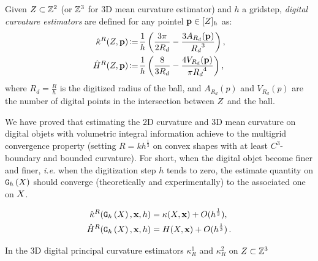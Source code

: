 \documentclass{llncs}
\newcommand{\ie}{\emph{i.e.} }
\begin{document}
\begin{Definition}
  Given $Z \subset {\mathbb{Z}}^2$ (or ${\mathbb{Z}}^3$ for 3D mean curvature estimator) and
  $h$ a gridstep, {\em digital curvature estimators} are defined for any pointel
  $\mathbf{p} \in \lbrack Z \rbrack_{h}$ as:
  \begin{align}
   \hat{\kappa}^{R}(Z,\mathbf{p}) &\!\mathrel{\mathop:}=\! \frac{1}{h} \left( \frac{3 \pi}{2 R_d} - \frac{3 A_{R_d}(\mathbf{p})}{{R_d}^3} \right),\label{eq:dig-curvature-estimator-k}\\
   \hat{H}^{R}(Z,\mathbf{p}) &\!\mathrel{\mathop:}=\! \frac{1}{h} \left( \frac{8}{3 R_d} - \frac{4V_{R_d}(\mathbf{p})}{{\pi R_d}^4} \right),\label{eq:dig-curvature-estimator-H}
  \end{align}
  where $R_d = \frac{R}{h}$ is the digitized radius of the ball, and
  $A_{R_d}(p)$ and $V_{R_d}(p)$ are the number of digital points in the
  intersection between $Z$ and the ball.
\end{Definition}

We have proved that estimating the 2D curvature and 3D mean curvature on digital
objets with volumetric integral information achieve to the multigrid convergence
property (setting $R = kh^\frac{1}{3}$ on convex shapes with at least
$C^3$-boundary and bounded curvature). For short, when the digital objet become
finer and finer, \ie when the digitization step $h$ tends to zero, the estimate
quantity on $\mathtt{G}_{h}\left(X\right)$ should converge (theoretically and experimentally) to the associated one on $X$.

\begin{align}
  \hat{\kappa}^{R}(\mathtt{G}_{h}\left(X\right),\mathbf{x},h) &= \kappa(X,\mathbf{x}) + O(h^{\frac{1}{3}}),\\
  \hat{H}^{R}(\mathtt{G}_{h}\left(X\right),\mathbf{x},h) &= H(X,\mathbf{x}) + O(h^{\frac{1}{3}}) \,.
\end{align}

In \cite{CVIU2014}
the 3D digital principal curvature estimators $\kappa^1_{R}$ and $\kappa^2_{R}$
on $Z\subset{\mathbb{Z}}^3$
\end{document}
